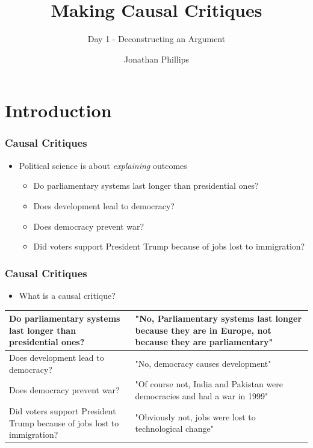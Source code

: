 \documentclass[xcolor=x11names,compress]{beamer}\usepackage[]{graphicx}\usepackage[]{color}
\title{Making Causal Critiques}
\subtitle{Day 1 - Deconstructing an Argument}
\author{Jonathan Phillips}
\renewcommand{\(}{\begin{columns}}
\renewcommand{\)}{\end{columns}}
\newcommand{\<}[1]{\begin{column}{#1}}
\renewcommand{\>}{\end{column}}
\begin{document}
\frame{\titlepage}

\section{Introduction}

\begin{frame}
\frametitle{Causal Critiques}
\begin{itemize}
\item Political science is about \textit{explaining} outcomes
\pause
\begin{itemize}
\item Do parliamentary systems last longer than presidential ones?
\pause
\item Does development lead to democracy?
\pause
\item Does democracy prevent war?
\pause
\item Did voters support President Trump because of jobs lost to immigration?
\end{itemize}
\end{itemize}

\end{frame}

\begin{frame}
\frametitle{Causal Critiques}
\begin{itemize}
\item What is a causal critique?
\pause
\end{itemize}
\begin{table}[htbp]
  \centering
    \begin{tabular}{|>{\raggedright}p{5cm}|p{5cm}|}
    \hline
    Do parliamentary systems last longer than presidential ones? & "No, Parliamentary systems last longer because they are in Europe, not because they are parliamentary" \pause \\
    \hline
    Does development lead to democracy? & "No, democracy causes development" \pause \\
    \hline
    Does democracy prevent war? & "Of course not, India and Pakistan were democracies and had a war in 1999" \pause \\
    \hline
    Did voters support President Trump because of jobs lost to immigration? & "Obviously not, jobs were lost to technological change" \\
    \hline
    \end{tabular}%
  \label{tab:addlabel}%
\end{table}%
\end{frame}
\end{document}
